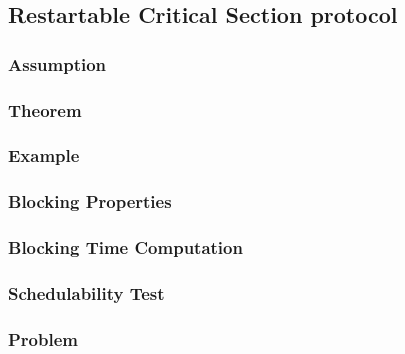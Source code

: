 \subsection{Restartable Critical Section protocol}
\subsubsection{Assumption}
\subsubsection{Theorem}
\subsubsection{Example}
\subsubsection{Blocking Properties}
\subsubsection{Blocking Time Computation}
\subsubsection{Schedulability Test}
\subsubsection{Problem}